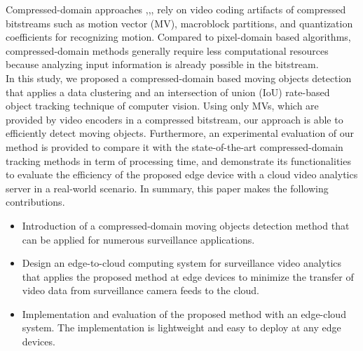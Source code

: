 Compressed-domain approaches \cite{favalli2000object},\cite{yoneyama1999moving},\cite{dong2006object},\cite{achanta2002compressed} rely on video coding artifacts of compressed bitstreams such as motion vector (MV), macroblock partitions, and quantization coefficients for recognizing motion. Compared to pixel-domain based algorithms, compressed-domain methods generally require less computational resources because analyzing input information is already possible in the bitstream.\\ In this study, we proposed a compressed-domain based moving objects detection that applies a data clustering and an intersection of union (IoU) rate-based object tracking technique of computer vision. Using only MVs, which are provided by video encoders in a compressed bitstream, our approach is able to efficiently detect moving objects. Furthermore, an experimental evaluation of our method is provided to compare it with the state-of-the-art compressed-domain tracking methods in term of processing time, and demonstrate its functionalities to evaluate the efficiency of the proposed edge device with a cloud video analytics server in a real-world scenario. In summary, this paper makes the following contributions.
\begin{itemize}
\item Introduction of a compressed-domain moving objects detection method that can be applied for numerous surveillance applications.
\item Design an edge-to-cloud computing system for surveillance video analytics that applies the proposed method at edge devices to minimize the transfer of video data from surveillance camera feeds to the cloud.
\item Implementation and evaluation of the proposed method with an edge-cloud system. The implementation is lightweight and easy to deploy at any edge devices.
\end{itemize}
%
%